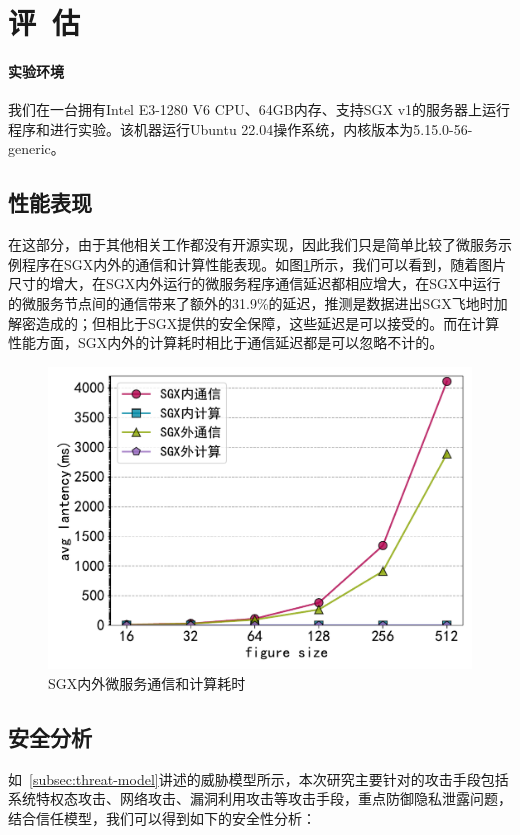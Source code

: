 \section{评\ 估}\label{sec:evaluation}

\paragraph{实验环境}

我们在一台拥有Intel E3-1280 V6 CPU、64GB内存、支持SGX v1的服务器上运行程序和进行实验。该机器运行Ubuntu 22.04操作系统，内核版本为5.15.0-56-generic。

\subsection{性能表现}

在这部分，由于其他相关工作都没有开源实现，因此我们只是简单比较了微服务示例程序在SGX内外的通信和计算性能表现。如图\ref{fig:evaluation}所示，我们可以看到，随着图片尺寸的增大，在SGX内外运行的微服务程序通信延迟都相应增大，在SGX中运行的微服务节点间的通信带来了额外的31.9\%的延迟，推测是数据进出SGX飞地时加解密造成的；但相比于SGX提供的安全保障，这些延迟是可以接受的。而在计算性能方面，SGX内外的计算耗时相比于通信延迟都是可以忽略不计的。

\begin{figure}[!ht]
    \centering
    \includegraphics[width=.6\textwidth]{figures/evaluation.pdf}
    \caption{SGX内外微服务通信和计算耗时}
    \label{fig:evaluation}
\end{figure}

\subsection{安全分析}

如~\cref{subsec:threat-model}讲述的威胁模型所示，本次研究主要针对的攻击手段包括系统特权态攻击、网络攻击、漏洞利用攻击等攻击手段，重点防御隐私泄露问题，结合信任模型，我们可以得到如下的安全性分析：

